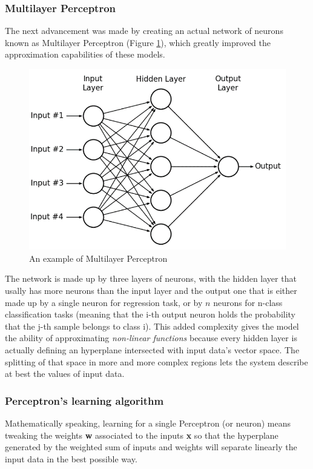 \documentclass[11pt,a4paper,titlepage]{book}
\begin{document}
\subsubsection{Multilayer Perceptron}
The next advancement was made by creating an actual network of neurons known as Multilayer Perceptron (Figure \ref{mlp_example}), which greatly improved the approximation capabilities of these models. 
\begin{figure}[h]
    \includegraphics[scale=0.4]{imgs/ch_1/A-hypothetical-example-of-Multilayer-Perceptron-Network.png}
    \centering
    \caption{An example of Multilayer Perceptron}
    \label{mlp_example}
\end{figure}
The network is made up by three layers of neurons, with the hidden layer that usally has more neurons than the input layer and the output one that is either made up by a single neuron for regression task, or by $n$ neurons for n-class classification tasks (meaning that the i-th output neuron holds the probability that the j-th sample belongs to class i).
\newline
\newline
This added complexity gives the model the ability of approximating \textit{non-linear functions} because every hidden layer is actually defining an hyperplane intersected with input data's vector space. The splitting of that space in more and more complex regions lets the system describe at best the values of input data.

\subsubsection{Perceptron's learning algorithm}
Mathematically speaking, learning for a single Perceptron (or neuron) means tweaking the weights \textbf{w} associated to the inputs \textbf{x} so that the hyperplane generated by the weighted sum of inputs and weights will separate linearly the input data in the best possible way.
\end{document}
